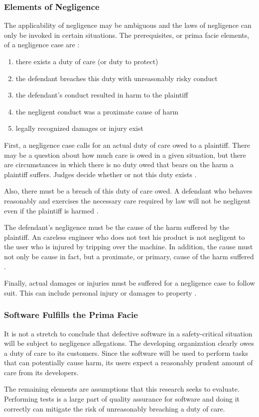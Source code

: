 \subsubsection{Elements of Negligence}\label{SS:Elements}
The applicability of negligence may be ambiguous and the laws of negligence can
only be invoked in certain situations. The prerequisites, or prima facie
elements, of a negligence case are \cite{Dobbs01}:

\singlespace
\begin{enumerate}
 \item there exists a duty of care (or duty to protect)
 \item the defendant breaches this duty with unreasonably risky conduct
 \item the defendant's conduct resulted in harm to the plaintiff
 \item the negligent conduct was a proximate cause of harm
 \item legally recognized damages or injury exist
\end{enumerate}
\doublespace

First, a negligence case calls for an actual duty of care owed to a plaintiff.
There may be a question about how much care is owed in a given situation, but
there are circumstances in which there is no duty owed that bears on the harm a
plaintiff suffers. Judges decide whether or not this duty exists \cite{Dobbs01}.

Also, there must be a breach of this duty of care owed. A defendant who behaves
reasonably and exercises the necessary care required by law will not be
negligent even if the plaintiff is harmed \cite{Dobbs01}.

The defendant's negligence must be the cause of the harm suffered by the
plaintiff. An careless engineer who does not test his product is not negligent
to the user who is injured by tripping over the machine. In addition, the cause
must not only be cause in fact, but a proximate, or primary, cause of the harm
suffered \cite{Dobbs01}.

Finally, actual damages or injuries must be suffered for a negligence case to
follow suit. This can include personal injury or damages to property
\cite{Dobbs01}.

\subsubsection{Software Fulfills the Prima Facie}

It is not a stretch to conclude that defective software in a safety-critical
situation will be subject to negligence allegations. The developing
organization clearly owes a duty of care to its customers. Since the software
will be used to perform tasks that can potentially cause harm, its users expect
a reasonably prudent amount of care from its developers.

The remaining elements are assumptions that this research seeks to evaluate.
Performing tests is a large part of quality assurance for software and doing it
correctly can mitigate the risk of unreasonably breaching a duty of care.


